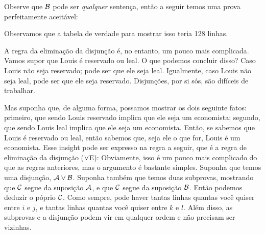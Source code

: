  

Observe que $\mathcal{B}$ pode ser \emph{qualquer} sentença, então a seguir temos uma prova perfeitamente aceit\' avel: 
\begin{fitchproof}
\end{fitchproof}


Observamos que a tabela de verdade para mostrar isso teria 128 linhas.

A regra da eliminação da disjunção é, no entanto, um pouco mais complicada. Vamos supor que  Louis é reservado ou leal.  O que podemos concluir disso? Caso  Louis  não seja reservado; pode ser que ele seja leal.   Igualmente, caso  Louis  não seja leal, pode ser que ele seja reservado.  Disjunções, por si sós, são difíceis de trabalhar.

Mas suponha que, de alguma forma, possamos mostrar os dois seguinte fatos: primeiro, que sendo Louis reservado implica que ele seja um economista; segundo, que sendo Louis leal implica que ele seja um economista.
Então, se sabemos que Louis é reservado ou leal, então sabemos que, seja ele o que for, Louis é um economista.   Esse insight pode ser expresso na regra a seguir, que é a regra de eliminação da disjunção  ($\vee$E):
Obviamente, isso é um pouco mais complicado do que as regras anteriores, mas o argumento é bastante simples. Suponha que temos uma disjunção, $\mathcal{A} \vee \mathcal{B}$. Suponha também que temos duas subprovas, mostrando que $\mathcal{C}$ segue da suposição $\mathcal{A}$, e que $\mathcal{C}$ segue da suposição $\mathcal{B}$. Então podemos deduzir o póprio $\mathcal{C}$. 
 Como sempre, pode haver  tantas linhas quantas  você quiser entre   $i$ e $j$,   e tantas linhas quantas você quiser entre $k$ e $l$. Além disso, as subprovas e a disjunção podem vir em qualquer ordem e não precisam ser vizinhas.

